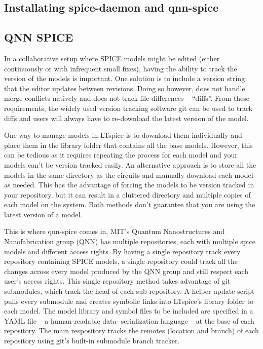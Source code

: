 \documentclass[]{article}
\begin{document}
\subsection{Installating spice-daemon and qnn-spice}

\subsection{QNN SPICE} \label{qnn-spice}

In a collaborative setup where SPICE models might be edited (either continuously or with infrequent small fixes), 
having the ability to track the version of the models is important. One solution is to include a version 
string that the editor updates between revisions. Doing so however, does not handle merge conflicts natively and
does not track file differences -- ``diffs''. From these requirements, the widely used version tracking software git can be
used to track diffs and users will always have to re-download the latest version of the model.

One way to manage models in LTspice is to download them individually and place them in the library folder that contains 
all the base models. However, this can be tedious as it requires repeating the process for each model and your
models can't be version tracked easily. An alternative
approach is to store all the models in the same directory as the circuits and manually download each model as needed. 
This has the advantage of forcing the models to be version tracked in your repository, but it can result in a cluttered 
directory and multiple copies of each model on the system. Both methods don't guarantee that you are using the latest
version of a model.

This is where qnn-spice comes in, MIT's Quantum Nanostructures and Nanofabrication group (QNN) has multiple
repositories, each with multiple spice models and different access rights. By having a single repository track every repository containing
SPICE models, a single repository could track all the changes across every model produced by the QNN group and still respect each user's access rights. 
This single repository method takes advantage of git submodules, which track the head of each sub-repository.
A helper update script pulls every submodule and creates symbolic links into LTspice's library folder to each model.
The model library and symbol files to be included are specified in a YAML file -- a human-readable data-
serialization language -- at the base of each repository. The main respository tracks the
remotes (location and branch) of each repository using git's built-in submodule branch tracker.
\end{document}
